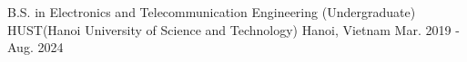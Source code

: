 

\begin{cventries}

  \cventry
    {B.S. in Electronics and Telecommunication Engineering (Undergraduate)} %
    {HUST(Hanoi University of Science and Technology)} %
    {Hanoi, Vietnam} %
    {Mar. 2019 - Aug. 2024} %
    {}

\end{cventries}
